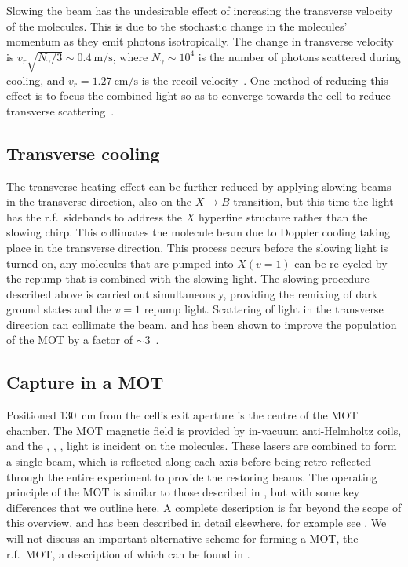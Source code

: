 Slowing the beam has the undesirable effect of increasing the transverse
velocity of the molecules. This is due to the stochastic change in the
molecules' momentum as they emit photons isotropically. The change in
transverse velocity is $v_r\sqrt{N_\gamma/3}\sim\SI{0.4}{\meter\per\second}$,
where $N_\gamma \sim 10^4$ is the number of photons scattered during cooling,
and $v_r=\SI{1.27}{\centi\meter\per\second}$ is the recoil
velocity~\cite{Jurgilas2021}.  One method of reducing this effect is to focus
the combined light so as to converge towards the cell to reduce transverse
scattering~\cite{Truppe2017a}.

\subsection{Transverse cooling}

The transverse heating effect can be further reduced by applying slowing beams
in the transverse direction, also on the $X\rightarrow B$ transition, but this
time the light has the r.f.\ sidebands to address the $X$ hyperfine structure
rather than the slowing chirp. This collimates the molecule beam due to Doppler
cooling taking place in the transverse direction. This process occurs before
the slowing light is turned on, any molecules that are pumped into $X(v=1)$ can
be re-cycled by the  repump that is combined with the slowing
light. The slowing procedure described above is carried out simultaneously,
providing the remixing of dark ground states and the $v=1$ repump light.
%
Scattering of light in the transverse direction can collimate the beam, and has
been shown to improve the population of the MOT by a factor of
$\sim3$~\cite{Jurgilas2021}.

\subsection{Capture in a MOT}

Positioned \SI{130}{\centi\meter} from the cell's exit aperture is the centre
of the MOT chamber. The MOT magnetic field is provided by in-vacuum
anti-Helmholtz coils, and the , , ,
 light is incident on the molecules. These lasers are combined to
form a single beam, which is reflected along each axis before being
retro-reflected through the entire experiment to provide the restoring beams.
%
The operating principle of the \CaF{} MOT is similar to those described in
, but with some key differences that we outline here.
A complete description is far beyond the scope of this overview, and has been
described in detail elsewhere, for example see .  We
will not discuss an important alternative scheme for forming a \CaF{} MOT, the
r.f.\ MOT, a description of which can be found in
.

